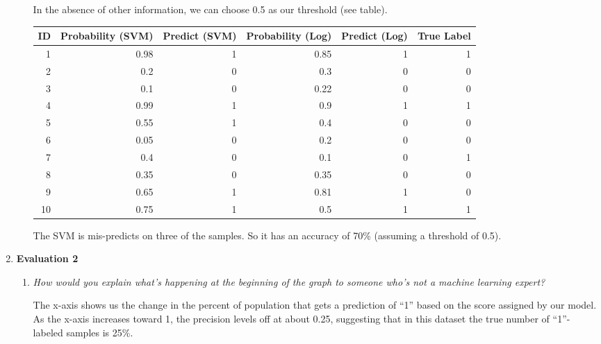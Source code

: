 \documentclass{article}
\begin{document}
\begin{enumerate}
\begin{enumerate}
                In the absence of other information, we can choose 0.5 as our
                threshold (see table).

                \begin{table}[h!]
                \begin{tabular}{r|r|r|r|r|r}
                    ID & Probability (SVM) & Predict (SVM) & Probability (Log)
                    & Predict (Log) & True Label \\
                    \hline
                    1 & 0.98 & 1 & 0.85 & 1 & 1 \\
                    2 & 0.2 & 0 & 0.3 & 0 & 0 \\
                    3 & 0.1 & 0 & 0.22 & 0 & 0 \\
                    4 & 0.99 & 1 & 0.9 & 1 & 1 \\
                    5 & 0.55 & 1 & 0.4 & 0 & 0 \\
                    6 & 0.05 & 0 & 0.2 & 0 & 0 \\
                    7 & 0.4 & 0 & 0.1 & 0 & 1 \\
                    8 & 0.35 & 0 & 0.35 & 0 & 0 \\
                    9 & 0.65 & 1 & 0.81 & 1 & 0 \\
                    10 & 0.75 & 1 & 0.5 & 1 & 1 \\
                \end{tabular}
                \end{table}

                The SVM is mis-predicts on three of the samples. So it has an
                accuracy of 70\% (assuming a threshold of 0.5).
        \end{enumerate}

    \item \textbf{Evaluation 2}
        \begin{enumerate}
            \item \textit{How would you explain what's happening at the
                beginning of the graph to someone who's not a machine learning
                expert?}

                The x-axis shows us the change in the percent of population
                that gets a prediction of ``1'' based on the score assigned by
                our model. As the x-axis increases toward 1, the precision
                levels off at about 0.25, suggesting that in this dataset the
                true number of ``1''-labeled samples is 25\%.


\end{enumerate}
\end{enumerate}
\end{document}
